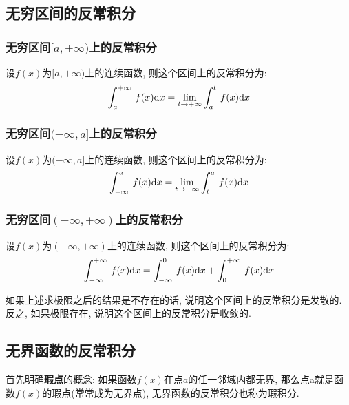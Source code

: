 \subsection{无穷区间的反常积分}
\subsubsection{无穷区间$ [a,+\infty) $上的反常积分}
设$ f(x) $为$ [a,+\infty) $上的连续函数, 则这个区间上的反常积分为:
\begin{equation*}
\displaystyle\int_{a}^{+\infty}\hspace{.2em}f(x)\mathrm{d}x=\lim\limits_{t \rightarrow +\infty}\displaystyle\int_{a}^{t}\hspace{.2em}f(x)\mathrm{d}x
\end{equation*}
\subsubsection{无穷区间$ (-\infty,a] $上的反常积分}
设$ f(x) $为$ (-\infty,a] $上的连续函数, 则这个区间上的反常积分为:
\begin{equation*}
\displaystyle\int_{-\infty}^{a}\hspace{.2em}f(x)\mathrm{d}x=\lim\limits_{t \rightarrow -\infty}\displaystyle\int_{t}^{a}\hspace{.2em}f(x)\mathrm{d}x
\end{equation*}
\subsubsection{无穷区间$ (-\infty,+\infty) $上的反常积分}
设$ f(x) $为$ (-\infty,+\infty) $上的连续函数, 则这个区间上的反常积分为:
\begin{equation*}
\displaystyle\int_{-\infty}^{+\infty}\hspace{.2em}f(x)\mathrm{d}x=\displaystyle\int_{-\infty}^{0}\hspace{.2em}f(x)\mathrm{d}x+\displaystyle\int_{0}^{+\infty}\hspace{.2em}f(x)\mathrm{d}x
\end{equation*}
\begin{tcolorbox}
如果上述求极限之后的结果是不存在的话, 说明这个区间上的反常积分是发散的. 反之, 如果极限存在, 说明这个区间上的反常积分是收敛的.
\end{tcolorbox}
\subsection{无界函数的反常积分}
首先明确\textbf{瑕点}的概念: 如果函数$ f(x) $在点$ a $的任一邻域内都无界, 那么点a就是函数$ f(x) $的瑕点(常常成为无界点), 无界函数的反常积分也称为瑕积分.
